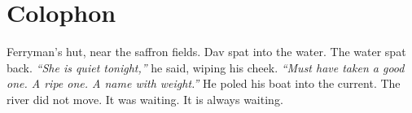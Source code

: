 \section*{Colophon}
Ferryman's hut, near the saffron fields. Dav spat into the water. The water spat back. \textit{``She is quiet tonight,''} he said, wiping his cheek. \textit{``Must have taken a good one. A ripe one. A name with weight.''} He poled his boat into the current. The river did not move. It was waiting. It is always waiting.
